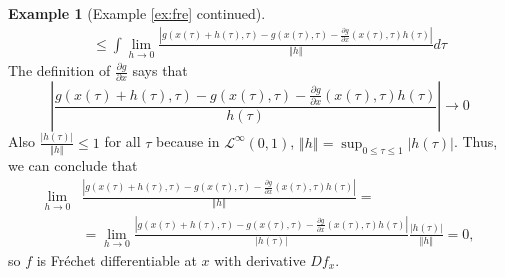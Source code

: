 \documentclass[12pt,reqno]{amsart}
\theoremstyle{definition}
\newtheorem*{example*}{Example}
\newcommand{\norm}[1]{\left\Vert {#1} \right\Vert}
\newcommand{\abs}[1]{\left\vert {#1} \right\vert}
\renewcommand{\to}{{\rightarrow}}
\begin{document}
\begin{example*}[Example \ref{ex:fre} continued]
\begin{align*}
    \;\; & \leq  \int \lim_{h \to 0} \frac{ \abs{ g(x(\tau) + h(\tau), \tau) -
        g(x(\tau),\tau) - \frac{\partial g}{\partial x}(x(\tau),\tau)
        h(\tau)} } {\norm{h}} d\tau 
  \end{align*}
  The definition of $\frac{\partial g}{\partial x}$ says that
  \[ \abs{\frac{ g(x(\tau) + h(\tau), \tau) -
      g(x(\tau),\tau) - \frac{\partial g}{\partial x}(x(\tau),\tau)
      h(\tau)}{h(\tau)}} \to 0 \]
  Also $\frac{\abs{h(\tau)}}{\norm{h}} \leq 1$ for all $\tau$ because
  in $\mathcal{L}^\infty(0,1)$, $\norm{h} = \sup_{0 \leq \tau \leq 1}
  \abs{h(\tau)}$. Thus, we can conclude that
  \begin{align*}
    \lim_{h \to 0} & \frac{ \abs{ g(x(\tau) + h(\tau), \tau) -
        g(x(\tau),\tau) - \frac{\partial g}{\partial x}(x(\tau),\tau)
        h(\tau)} } {\norm{h}}
    = \\ 
    & = \lim_{h \to 0} \frac{ \abs{ g(x(\tau) + h(\tau), \tau) -
        g(x(\tau),\tau) - \frac{\partial g}{\partial x}(x(\tau),\tau)
        h(\tau)} } {\abs{h(\tau)}} \frac{\abs{h(\tau)}} {\norm{h}}  
    = 0,
  \end{align*}
  so $f$ is Fr\'{e}chet differentiable at $x$ with derivative $Df_x$. 
\end{example*}
\end{document}
